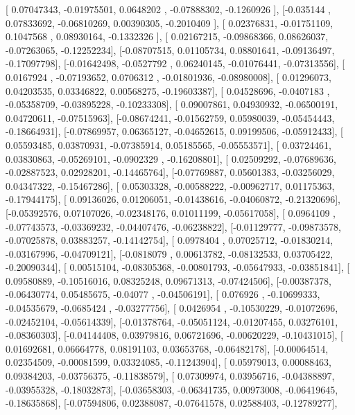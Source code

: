 \documentclass{article}
\begin{document}
       [ 0.07047343, -0.01975501,  0.0648202 , -0.07888302, -0.1260926 ],
       [-0.035144  ,  0.07833692, -0.06810269,  0.00390305, -0.2010409 ],
       [ 0.02376831, -0.01751109,  0.1047568 ,  0.08930164, -0.1332326 ],
       [ 0.02167215, -0.09868366,  0.08626037, -0.07263065, -0.12252234],
       [-0.08707515,  0.01105734,  0.08801641, -0.09136497, -0.17097798],
       [-0.01642498, -0.0527792 ,  0.06240145, -0.01076441, -0.07313556],
       [ 0.0167924 , -0.07193652,  0.0706312 , -0.01801936, -0.08980008],
       [ 0.01296073,  0.04203535,  0.03346822,  0.00568275, -0.19603387],
       [ 0.04528696, -0.0407183 , -0.05358709, -0.03895228, -0.10233308],
       [ 0.09007861,  0.04930932, -0.06500191,  0.04720611, -0.07515963],
       [-0.08674241, -0.01562759,  0.05980039, -0.05454443, -0.18664931],
       [-0.07869957,  0.06365127, -0.04652615,  0.09199506, -0.05912433],
       [ 0.05593485,  0.03870931, -0.07385914,  0.05185565, -0.05553571],
       [ 0.03724461,  0.03830863, -0.05269101, -0.0902329 , -0.16208801],
       [ 0.02509292, -0.07689636, -0.02887523,  0.02928201, -0.14465764],
       [-0.07769887,  0.05601383, -0.03256029,  0.04347322, -0.15467286],
       [ 0.05303328, -0.00588222, -0.00962717,  0.01175363, -0.17944175],
       [ 0.09136026,  0.01206051, -0.01438616, -0.04060872, -0.21320696],
       [-0.05392576,  0.07107026, -0.02348176,  0.01011199, -0.05617058],
       [ 0.0964109 , -0.07743573, -0.03369232, -0.04407476, -0.06238822],
       [-0.01129777, -0.09873578, -0.07025878,  0.03883257, -0.14142754],
       [ 0.0978404 ,  0.07025712, -0.01830214, -0.03167996, -0.04709121],
       [-0.0818079 ,  0.00613782, -0.08132533,  0.03705422, -0.20090344],
       [ 0.00515104, -0.08305368, -0.00801793, -0.05647933, -0.03851841],
       [ 0.09580889, -0.10516016,  0.08325248,  0.09671313, -0.07424506],
       [-0.00387378, -0.06430774,  0.05485675, -0.04077   , -0.04506191],
       [ 0.076926  , -0.10699333, -0.04535679, -0.0685424 , -0.03277756],
       [ 0.0426954 , -0.10530229, -0.01072696, -0.02452104, -0.05614339],
       [-0.01378764, -0.05051124, -0.01207455,  0.03276101, -0.08360303],
       [-0.04144408,  0.03979816,  0.06721696, -0.00620229, -0.10431015],
       [ 0.01692681,  0.06664778,  0.08191103,  0.03653768, -0.06482178],
       [-0.00064514,  0.02354509, -0.00081599,  0.03324085, -0.11243904],
       [ 0.05979013,  0.00088463,  0.09384203, -0.03756375, -0.11838579],
       [ 0.07309974,  0.03956716, -0.04388897, -0.03955328, -0.18032873],
       [-0.03658303, -0.06341735,  0.00973008, -0.06419645, -0.18635868],
       [-0.07594806,  0.02388087, -0.07641578,  0.02588403, -0.12789277],
\end{document}
